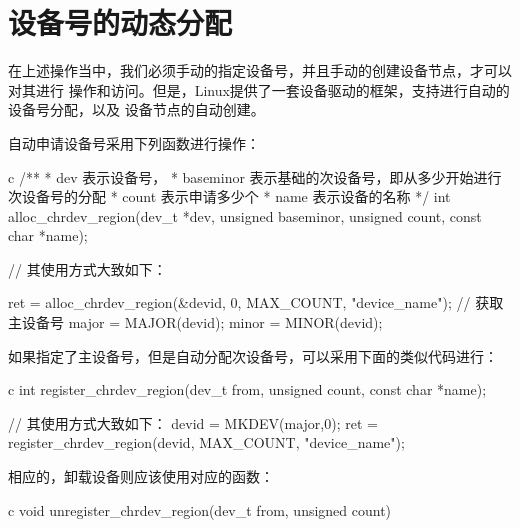 \section{设备号的动态分配}
在上述操作当中，我们必须手动的指定设备号，并且手动的创建设备节点，才可以对其进行
操作和访问。但是，Linux提供了一套设备驱动的框架，支持进行自动的设备号分配，以及
设备节点的自动创建。

自动申请设备号采用下列函数进行操作：
\begin{code-block}{c}
/**
* dev 表示设备号，
* baseminor 表示基础的次设备号，即从多少开始进行次设备号的分配
* count 表示申请多少个
* name 表示设备的名称
*/
int alloc_chrdev_region(dev_t *dev, unsigned baseminor,
    unsigned count, const char *name);

// 其使用方式大致如下：

ret = alloc_chrdev_region(&devid, 0, MAX_COUNT, "device_name");
// 获取主设备号
major = MAJOR(devid);
minor = MINOR(devid);
\end{code-block}

如果指定了主设备号，但是自动分配次设备号，可以采用下面的类似代码进行：
\begin{code-block}{c}
int register_chrdev_region(dev_t from, unsigned count, const char *name);

// 其使用方式大致如下：
devid = MKDEV(major,0);
ret = register_chrdev_region(devid, MAX_COUNT, "device_name");
\end{code-block}

相应的，卸载设备则应该使用对应的函数：
\begin{code-block}{c}
void unregister_chrdev_region(dev_t from, unsigned count)
\end{code-block}

